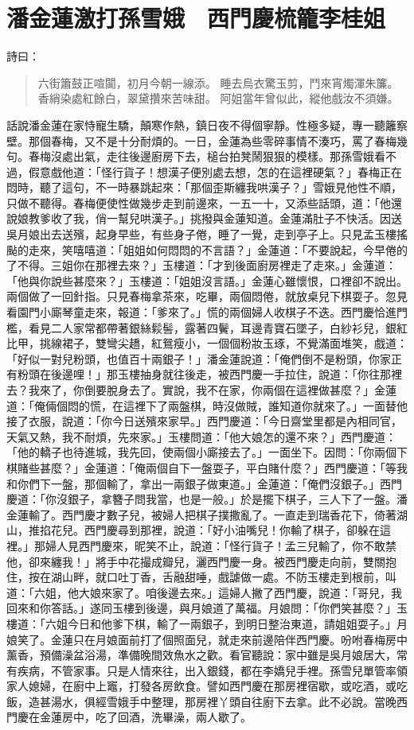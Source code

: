 
\chapter{潘金蓮激打孫雪娥　西門慶梳籠李桂姐}

詩曰：
\begin{quote}
六街簫鼓正喧闐，初月今朝一線添。
睡去烏衣驚玉剪，鬥來宵燭渾朱簾。
香綃染處紅餘白，翠黛攢來苦味甜。
阿姐當年曾似此，縱他戲汝不須嫌。
\end{quote}

話說潘金蓮在家恃寵生驕，顛寒作熱，鎮日夜不得個寧靜。性極多疑，專一聽籬察壁。那個春梅，又不是十分耐煩的。一日，金蓮為些零碎事情不湊巧，罵了春梅幾句。春梅沒處出氣，走往後邊廚房下去，槌台拍凳鬧狠狠的模樣。那孫雪娥看不過，假意戲他道：「怪行貨子！想漢子便別處去想，怎的在這裡硬氣？」春梅正在悶時，聽了這句，不一時暴跳起來：「那個歪斯纏我哄漢子？」雪娥見他性不順，只做不聽得。春梅便使性做幾步走到前邊來，一五一十，又添些話頭，道：「他還說娘教爹收了我，俏一幫兒哄漢子。」挑撥與金蓮知道。金蓮滿肚子不快活。因送吳月娘出去送殯，起身早些，有些身子倦，睡了一覺，走到亭子上。只見孟玉樓搖颭的走來，笑嘻嘻道：「姐姐如何悶悶的不言語？」金蓮道：「不要說起，今早倦的了不得。三姐你在那裡去來？」玉樓道：「才到後面廚房裡走了走來。」金蓮道：「他與你說些甚麼來？」玉樓道：「姐姐沒言語。」金蓮心雖懷恨，口裡卻不說出。兩個做了一回針指。只見春梅拿茶來，吃畢，兩個悶倦，就放桌兒下棋耍子。忽見看園門小廝琴童走來，報道：「爹來了。」慌的兩個婦人收棋子不迭。西門慶恰進門檻，看見二人家常都帶著銀絲鬏髻，露著四鬢，耳邊青寶石墜子，白紗衫兒，銀紅比甲，挑線裙子，雙彎尖趫，紅鴛瘦小，一個個粉妝玉琢，不覺滿面堆笑，戲道：「好似一對兒粉頭，也值百十兩銀子！」潘金蓮說道：「俺們倒不是粉頭，你家正有粉頭在後邊哩！」那玉樓抽身就往後走，被西門慶一手拉住，說道：「你往那裡去？我來了，你倒要脫身去了。實說，我不在家，你兩個在這裡做甚麼？」金蓮道：「俺倆個悶的慌，在這裡下了兩盤棋，時沒做賊，誰知道你就來了。」一面替他接了衣服，說道：「你今日送殯來家早。」西門慶道：「今日齋堂里都是內相同官，天氣又熱，我不耐煩，先來家。」玉樓問道：「他大娘怎的還不來？」西門慶道：「他的轎子也待進城，我先回，使兩個小廝接去了。」一面坐下。因問：「你兩個下棋賭些甚麼？」金蓮道：「俺兩個自下一盤耍子，平白賭什麼？」西門慶道：「等我和你們下一盤，那個輸了，拿出一兩銀子做東道。」金蓮道：「俺們沒銀子。」西門慶道：「你沒銀子，拿簪子問我當，也是一般。」於是擺下棋子，三人下了一盤。潘金蓮輸了。西門慶才數子兒，被婦人把棋子撲撒亂了。一直走到瑞香花下，倚著湖山，推掐花兒。西門慶尋到那裡，說道：「好小油嘴兒！你輸了棋子，卻躲在這裡。」那婦人見西門慶來，昵笑不止，說道：「怪行貨子！孟三兒輸了，你不敢禁他，卻來纏我！」將手中花撮成瓣兒，灑西門慶一身。被西門慶走向前，雙關抱住，按在湖山畔，就口吐丁香，舌融甜唾，戲謔做一處。不防玉樓走到根前，叫道：「六姐，他大娘來家了。咱後邊去來。」這婦人撇了西門慶，說道：「哥兒，我回來和你答話。」遂同玉樓到後邊，與月娘道了萬福。月娘問：「你們笑甚麼？」玉樓道：「六姐今日和他爹下棋，輸了一兩銀子，到明日整治東道，請姐姐耍子。」月娘笑了。金蓮只在月娘面前打了個照面兒，就走來前邊陪伴西門慶。吩咐春梅房中薰香，預備澡盆浴湯，準備晚間效魚水之歡。看官聽說：家中雖是吳月娘居大，常有疾病，不管家事。只是人情來往，出入銀錢，都在李嬌兒手裡。孫雪兒單管率領家人媳婦，在廚中上竈，打發各房飲食。譬如西門慶在那房裡宿歇，或吃酒，或吃飯，造甚湯水，俱經雪娥手中整理，那房裡丫頭自往廚下去拿。此不必說。當晚西門慶在金蓮房中，吃了回酒，洗畢澡，兩人歇了。

